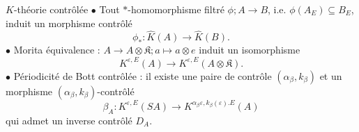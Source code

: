 \begin{frame}{$K$-théorie contrôlée}
$\bullet$ Tout $*$-homomorphisme filtré $\phi; A\rightarrow B$, i.e. $\phi(A_E)\subseteq B_E$, induit un morphisme contrôlé 
\[\phi_* : \hat K(A)\rightarrow \hat K(B).\]
$\bullet$ Morita équivalence : $A \rightarrow A\otimes\mathfrak K ; a\mapsto a\otimes e$ induit un isomorphisme
\[K^{\varepsilon,E}(A)\rightarrow K^{\varepsilon,E}(A\otimes\mathfrak K).\]
$\bullet$ Périodicité de Bott contrôlée : il existe une paire de contrôle $(\alpha_\beta,k_\beta)$ et un morphisme $(\alpha_\beta,k_\beta)$-contrôlé
\[\beta_A : K^{\varepsilon, E}(SA)\rightarrow K^{\alpha_\beta\varepsilon, k_\beta(\varepsilon) . E}(A)\]
qui admet un inverse contrôlé $D_A$.
\end{frame}












































